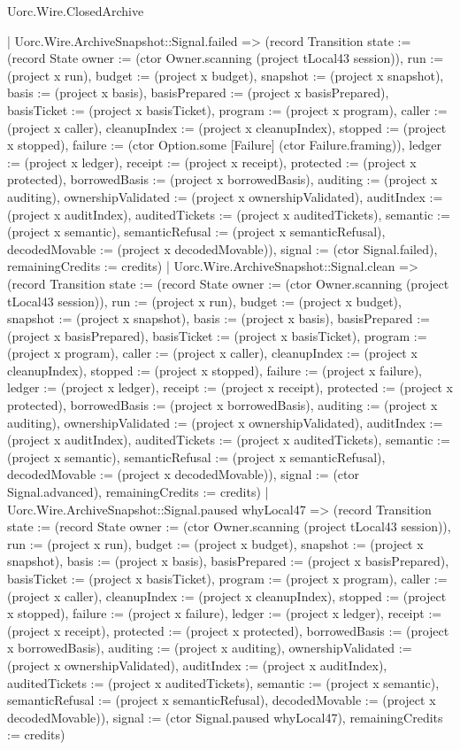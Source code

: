 \begin{lexlean}{Uorc.Wire.ClosedArchive}
\begin{semanticmodule}
{    | Uorc.Wire.ArchiveSnapshot::Signal.failed => (record Transition {state := (record State {owner := (ctor Owner.scanning (project tLocal43 session)), run := (project x run), budget := (project x budget), snapshot := (project x snapshot), basis := (project x basis), basisPrepared := (project x basisPrepared), basisTicket := (project x basisTicket), program := (project x program), caller := (project x caller), cleanupIndex := (project x cleanupIndex), stopped := (project x stopped), failure := (ctor Option.some [Failure] (ctor Failure.framing)), ledger := (project x ledger), receipt := (project x receipt), protected := (project x protected), borrowedBasis := (project x borrowedBasis), auditing := (project x auditing), ownershipValidated := (project x ownershipValidated), auditIndex := (project x auditIndex), auditedTickets := (project x auditedTickets), semantic := (project x semantic), semanticRefusal := (project x semanticRefusal), decodedMovable := (project x decodedMovable)}), signal := (ctor Signal.failed), remainingCredits := credits})
    | Uorc.Wire.ArchiveSnapshot::Signal.clean => (record Transition {state := (record State {owner := (ctor Owner.scanning (project tLocal43 session)), run := (project x run), budget := (project x budget), snapshot := (project x snapshot), basis := (project x basis), basisPrepared := (project x basisPrepared), basisTicket := (project x basisTicket), program := (project x program), caller := (project x caller), cleanupIndex := (project x cleanupIndex), stopped := (project x stopped), failure := (project x failure), ledger := (project x ledger), receipt := (project x receipt), protected := (project x protected), borrowedBasis := (project x borrowedBasis), auditing := (project x auditing), ownershipValidated := (project x ownershipValidated), auditIndex := (project x auditIndex), auditedTickets := (project x auditedTickets), semantic := (project x semantic), semanticRefusal := (project x semanticRefusal), decodedMovable := (project x decodedMovable)}), signal := (ctor Signal.advanced), remainingCredits := credits})
    | Uorc.Wire.ArchiveSnapshot::Signal.paused whyLocal47 => (record Transition {state := (record State {owner := (ctor Owner.scanning (project tLocal43 session)), run := (project x run), budget := (project x budget), snapshot := (project x snapshot), basis := (project x basis), basisPrepared := (project x basisPrepared), basisTicket := (project x basisTicket), program := (project x program), caller := (project x caller), cleanupIndex := (project x cleanupIndex), stopped := (project x stopped), failure := (project x failure), ledger := (project x ledger), receipt := (project x receipt), protected := (project x protected), borrowedBasis := (project x borrowedBasis), auditing := (project x auditing), ownershipValidated := (project x ownershipValidated), auditIndex := (project x auditIndex), auditedTickets := (project x auditedTickets), semantic := (project x semantic), semanticRefusal := (project x semanticRefusal), decodedMovable := (project x decodedMovable)}), signal := (ctor Signal.paused whyLocal47), remainingCredits := credits})
}
\end{semanticmodule}
\end{lexlean}
